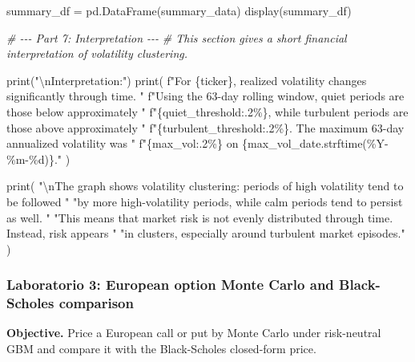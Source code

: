 \documentclass[
  11pt,
]{article}
\newenvironment{Shaded}{}{}
\newcommand{\BuiltInTok}[1]{\textcolor[rgb]{0.00,0.50,0.00}{#1}}
\newcommand{\CharTok}[1]{\textcolor[rgb]{0.25,0.44,0.63}{#1}}
\newcommand{\CommentTok}[1]{\textcolor[rgb]{0.38,0.63,0.69}{\textit{#1}}}
\newcommand{\NormalTok}[1]{#1}
\newcommand{\OperatorTok}[1]{\textcolor[rgb]{0.40,0.40,0.40}{#1}}
\newcommand{\SpecialCharTok}[1]{\textcolor[rgb]{0.25,0.44,0.63}{#1}}
\newcommand{\SpecialStringTok}[1]{\textcolor[rgb]{0.73,0.40,0.53}{#1}}
\newcommand{\StringTok}[1]{\textcolor[rgb]{0.25,0.44,0.63}{#1}}
\begin{document}
\begin{Shaded}
\begin{Highlighting}[]
\NormalTok{summary\_df }\OperatorTok{=}\NormalTok{ pd.DataFrame(summary\_data)}
\NormalTok{display(summary\_df)}


\CommentTok{\# {-}{-}{-} Part 7: Interpretation {-}{-}{-}}
\CommentTok{\# This section gives a short financial interpretation of volatility clustering.}

\BuiltInTok{print}\NormalTok{(}\StringTok{"}\CharTok{\textbackslash{}n}\StringTok{Interpretation:"}\NormalTok{)}
\BuiltInTok{print}\NormalTok{(}
    \SpecialStringTok{f"For }\SpecialCharTok{\{}\NormalTok{ticker}\SpecialCharTok{\}}\SpecialStringTok{, realized volatility changes significantly through time. "}
    \SpecialStringTok{f"Using the 63{-}day rolling window, quiet periods are those below approximately "}
    \SpecialStringTok{f"}\SpecialCharTok{\{}\NormalTok{quiet\_threshold}\SpecialCharTok{:.2\%\}}\SpecialStringTok{, while turbulent periods are those above approximately "}
    \SpecialStringTok{f"}\SpecialCharTok{\{}\NormalTok{turbulent\_threshold}\SpecialCharTok{:.2\%\}}\SpecialStringTok{. The maximum 63{-}day annualized volatility was "}
    \SpecialStringTok{f"}\SpecialCharTok{\{}\NormalTok{max\_vol}\SpecialCharTok{:.2\%\}}\SpecialStringTok{ on }\SpecialCharTok{\{}\NormalTok{max\_vol\_date}\SpecialCharTok{.}\NormalTok{strftime(}\StringTok{\textquotesingle{}\%Y{-}\%m{-}}\SpecialCharTok{\%d}\StringTok{\textquotesingle{}}\NormalTok{)}\SpecialCharTok{\}}\SpecialStringTok{."}
\NormalTok{)}

\BuiltInTok{print}\NormalTok{(}
    \StringTok{"}\CharTok{\textbackslash{}n}\StringTok{The graph shows volatility clustering: periods of high volatility tend to be followed "}
    \StringTok{"by more high{-}volatility periods, while calm periods tend to persist as well. "}
    \StringTok{"This means that market risk is not evenly distributed through time. Instead, risk appears "}
    \StringTok{"in clusters, especially around turbulent market episodes."}
\NormalTok{)}
\end{Highlighting}
\end{Shaded}

\subsubsection{Laboratorio 3: European option Monte Carlo and Black-Scholes comparison}\label{laboratorio-3-european-option-monte-carlo-and-black-scholes-comparison}

\textbf{Objective.} Price a European call or put by Monte Carlo under risk-neutral GBM and compare it with the Black-Scholes closed-form price.
\end{document}
